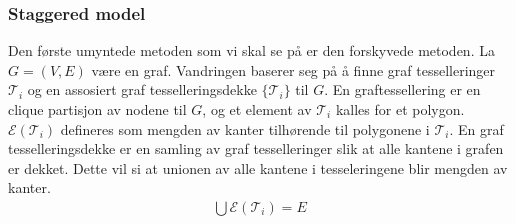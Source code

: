     \subsubsection{Staggered model} %

        Den første umyntede metoden som vi skal se på er den forskyvede metoden. La $G=(V,E)$ være en graf. Vandringen baserer seg på å finne graf tesselleringer $\mathcal{T}_i$ og en assosiert graf tesselleringsdekke $\{\mathcal{T}_i\}$ til $G$. En graftessellering er en clique partisjon av nodene til $G$, og et element av $\mathcal{T}_i$ kalles for et polygon. $\mathcal{E}(\mathcal{T}_i)$ defineres som mengden av kanter tilhørende til polygonene i $\mathcal{T}_i$. En graf tesselleringsdekke er en samling av graf tesselleringer slik at alle kantene i grafen er dekket. Dette vil si at unionen av alle kantene i tesseleringene blir mengden av kanter.
        \begin{align*}
            \bigcup\mathcal{E}(\mathcal{T}_i) = E
        \end{align*}

